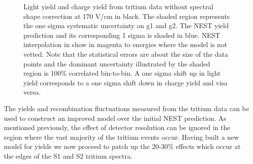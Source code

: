 \begin{figure}[h!]
\hfill
{}

\caption{Light yield and charge yield from tritium data without spectral shape correction at 170 V/cm in black. The shaded region represents the one sigma systematic uncertainty on g1 and g2. The NEST yield prediction and its corresponding 1 sigma is shaded in blue. NEST interpolation in show in magenta to energies where the model is not vetted. Note that the statistical errors are about the size of the data points and the dominant uncertainty illustrated by the shaded region is 100\% correlated bin-to-bin. A one sigma shift up in light yield corresponds to a one sigma shift down in charge yield and visa versa.}
\label{fig:LYQY_iter0}
\end{figure}
\renewcommand{\baselinestretch}{2}
\small\normalsize

The yields and recombination fluctuations measured from the tritium data can be used to construct an improved model over the initial NEST prediction. As mentioned previously, the effect of detector resolution can be ignored in the region where the vast majority of the tritium events occur. Having built a new model for yields we now proceed to patch up the 20-30\% effects which occur at the edges of the S1 and S2 tritium spectra.


